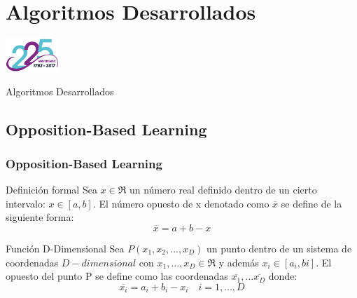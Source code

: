 
\section{Algoritmos Desarrollados}

\begin{frame}
  \centering
  \includegraphics[width=0.15\textwidth]{img/ullesc.eps}
  \begin{scriptsize}
    \begin{center}
    \Huge{Algoritmos Desarrollados}
    \end{center}
  \end{scriptsize}
\end{frame}

\subsection{Opposition-Based Learning}
\begin{frame}
\frametitle{Opposition-Based Learning}
\begin{block}{Definición formal}
Sea $x \in \Re $  un número real definido dentro de un cierto intervalo: $x \in [a,b]$. El número opuesto de x denotado como $\overline{x}$ se define de la siguiente forma:
 \begin{equation}
     \overline{x} = a + b - x 
 \end{equation}
 \end{block}
 \begin{block}{Función D-Dimensional}
Sea $ P(x_{1}, x_{2},...,x_{D}) $ un punto dentro de un sistema de coordenadas $D-dimensional$ con $ x_{1},...,x_{D} \in \Re$ y además $ x_{i} \in [a_{i}, b{i}]$. El opuesto del punto P se define como las coordenadas $\overline{x_{1}},...\overline{x_{D}}$ donde:
\begin{equation}
    \overline{x_{i}} = a_{i} + b_{i} - x_{i} \quad i = 1,...,D 
\end{equation}
 \end{block}
\end{frame}


